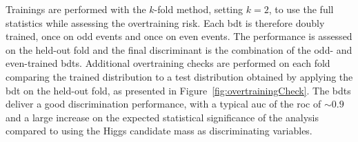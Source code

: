 Trainings are performed with the $k$-fold method, setting $k = 2$, to use the full statistics while assessing the overtraining risk. Each \gls{bdt} is therefore doubly trained, once on odd events and once on even events. The performance is assessed on the held-out fold and the final discriminant is the combination of the odd- and even-trained \glspl{bdt}. Additional overtraining checks are performed on each fold comparing the trained distribution to a test distribution obtained by applying the \gls{bdt} on the held-out fold, as presented in Figure~\ref{fig:overtrainingCheck}. The \glspl{bdt} deliver a good discrimination performance, with a typical \gls{auc} of the \gls{roc} of $\sim 0.9$ and a large increase on the expected statistical significance of the analysis compared to using the Higgs candidate mass as discriminating variables. \\

